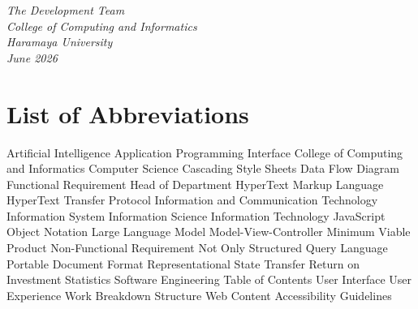 ﻿\documentclass[12pt, a4paper]{article}
\begin{document}
\vspace{2cm}
\begin{flushright}
\textit{The Development Team}\\
\textit{College of Computing and Informatics}\\
\textit{Haramaya University}\\
\textit{June 2026}
\end{flushright}

\newpage
\section*{List of Abbreviations}

\begin{acronym}[WCAG]  %
      {Artificial Intelligence}
     {Application Programming Interface}
     {College of Computing and Informatics}
      {Computer Science}
     {Cascading Style Sheets}
     {Data Flow Diagram}
      {Functional Requirement}
     {Head of Department}
    {HyperText Markup Language}
    {HyperText Transfer Protocol}
     {Information and Communication Technology}
      {Information System}
     {Information Science}
      {Information Technology}
    {JavaScript Object Notation}
     {Large Language Model}
     {Model-View-Controller}
     {Minimum Viable Product}
     {Non-Functional Requirement}
   {Not Only Structured Query Language}
     {Portable Document Format}
    {Representational State Transfer}
     {Return on Investment}
    {Statistics}
     {Software Engineering}
     {Table of Contents}
      {User Interface}
      {User Experience}
     {Work Breakdown Structure}
    {Web Content Accessibility Guidelines}
\end{acronym}

\newpage
\tableofcontents
\newpage
\end{document}
